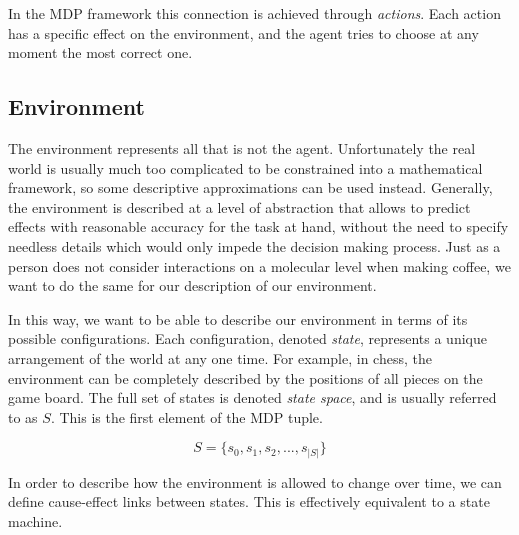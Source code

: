 
In the MDP framework this connection is achieved through \textit{actions}. Each action has a
specific effect on the environment, and the agent tries to choose at any moment the most correct
one.

\subsection{Environment}

The environment represents all that is not the agent. Unfortunately the real world is usually much
too complicated to be constrained into a mathematical framework, so some descriptive approximations
can be used instead. Generally, the environment is described at a level of abstraction that allows
to predict effects with reasonable accuracy for the task at hand, without the need to specify
needless details which would only impede the decision making process. Just as a person does not
consider interactions on a molecular level when making coffee, we want to do the same for our
description of our environment.

In this way, we want to be able to describe our environment in terms of its possible configurations.
Each configuration, denoted \textit{state}, represents a unique arrangement of the world at any one
time. For example, in chess, the environment can be completely described by the positions of all
pieces on the game board. The full set of states is denoted \textit{state space}, and is usually
referred to as $S$. This is the first element of the MDP tuple.

\[ S = \{s_0, s_1, s_2, ..., s_{|S|}\} \]

In order to describe how the environment is allowed to change over time, we can define
cause-effect links between states. This is effectively equivalent to a state machine.


